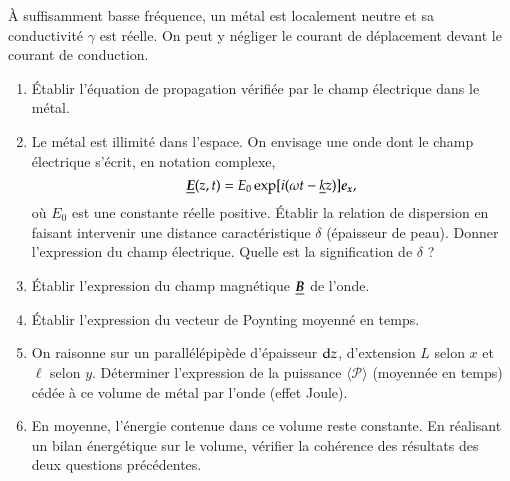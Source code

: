 \begin{exocor}
	À suffisamment basse fréquence, un métal est localement neutre et sa
	conductivité $\gamma$ est réelle. On peut y négliger le courant de 
	déplacement devant le courant de conduction.
	\begin{enumerate}
		\item Établir l'équation de propagation vérifiée par le champ
		 électrique dans le métal.
		\item Le métal est illimité dans l'espace. On envisage une 
		  onde dont le champ électrique s'écrit, en notation complexe, 
		  \begin{equation}
			  \complex{\vece}(z, t) = E_0 \exp[i(\omega t - \complex{k}z)]\ex,
		 \end{equation}
		 où $E_0$ est une constante réelle positive. Établir la relation
		 de dispersion en faisant intervenir une distance caractéristique 
		 $\delta$ (épaisseur de peau). Donner l'expression du champ 
		 électrique. Quelle est la signification de $\delta$ ?
	 \item Établir l'expression du champ magnétique $\complex{\vecb}$ de l'onde. 
		\item Établir l'expression du vecteur de Poynting moyenné en temps.
		\item On raisonne sur un parallélépipède d'épaisseur
		  $\mathrm{d}z$, d'extension $L$ selon $x$ et $\ell$ selon $y$. Déterminer
		  l'expression de la puissance $\langle \mathcal{P} \rangle$ 
		  (moyennée en temps)
		  cédée à ce volume de métal par l'onde (effet Joule).
		\item En moyenne, l'énergie contenue dans ce volume reste constante.
		  En réalisant un bilan énergétique sur le volume, vérifier 
		  la cohérence des résultats des deux questions précédentes.
	\end{enumerate}
\end{exocor}

\newpage


